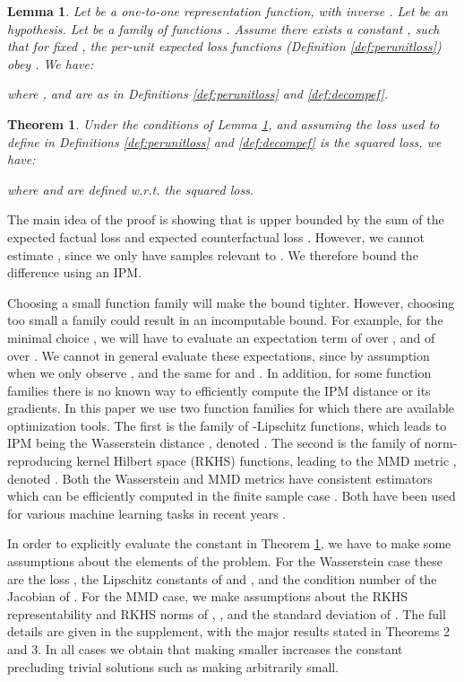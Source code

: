 \documentclass{article}
\newtheorem{thmlem}{Lemma}
\newtheorem{thmthm}{Theorem}
\begin{document}
\begin{thmlem}\label{lem:gen}
Let  be a one-to-one representation function, with inverse .
Let  be an hypothesis. Let  be a family of functions . Assume there exists a constant , such that for fixed , the per-unit expected loss functions  (Definition \ref{def:perunitloss}) obey . We have:

where ,  and  are as in Definitions \ref{def:perunitloss} and \ref{def:decompef}.
\end{thmlem}


\begin{thmthm}\label{thm:gen}
Under the conditions of Lemma \ref{lem:gen}, and assuming the loss  used to define  in Definitions \ref{def:perunitloss} and \ref{def:decompef} is the squared loss, we have:

where  and  are defined w.r.t. the squared loss.
\end{thmthm}

The main idea of the proof is showing that  is upper bounded by the sum of the expected factual loss  and expected counterfactual loss .  However, we cannot estimate , since we only have samples relevant to .  We therefore bound the difference  using an IPM.


Choosing a small function family  will make the bound tighter. However, choosing too small a family could result in an incomputable bound. For example, for the minimal choice , we will have to evaluate an expectation term of  over , and of  over . We cannot in general evaluate these expectations, since by assumption when  we only observe , and the same for  and . In addition, for some function families there is no known way to efficiently compute the IPM distance or its gradients. In this paper we use two function families for which there are available optimization tools. The first is the family of -Lipschitz functions, which leads to IPM being the Wasserstein distance \citep{villani2008optimal,sriperumbudur2012empirical}, denoted . The second is the family of norm- reproducing kernel Hilbert space (RKHS) functions, leading to the MMD metric \citep{gretton2012mmd,sriperumbudur2012empirical}, denoted . Both the Wasserstein and MMD metrics have consistent estimators which can be efficiently computed in the finite sample case \citep{sriperumbudur2012empirical}. Both have been used for various machine learning tasks in recent years \citep{gretton2009covariate,gretton2012mmd,cuturi2014fast}.


In order to explicitly evaluate the constant  in Theorem \ref{thm:gen}, we have to make some assumptions about the elements of the problem. For the Wasserstein case these are the loss , the Lipschitz constants of  and , and the condition number of the Jacobian of . For the MMD case, we make assumptions about the RKHS representability and RKHS norms of  , , and the standard deviation of . The full details are given in the supplement, with the major results stated in Theorems 2 and 3. In all cases we obtain that making  smaller increases the constant  precluding trivial solutions such as making  arbitrarily small.
\end{document}
